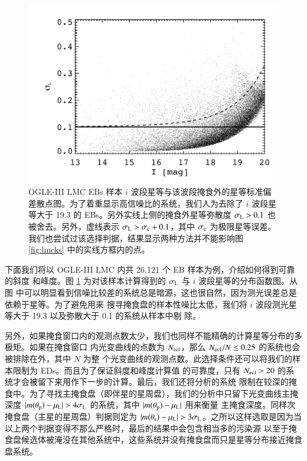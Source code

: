 \begin{figure}[ht!]
\centering
\includegraphics[width=1.0\textwidth,trim={0.4in 0.2in 0 0}]{figures/chapter3/f4_magerr.pdf}
\caption{OGLE-III LMC EBs 样本 $i$ 波段星等与该波段掩食外的星等标准偏差散点图。为了着重显示高信噪比的系统，我们人为去除了 $i$ 波段星等大于 19.3 的 EBs。另外实线上侧的掩食外星等弥散度 $\sigma_\mathrm{L} > 0.1$ 也被舍去。另外，虚线表示 $\sigma_\mathrm{L} > \sigma_\mathrm{c} + 0.1 $，其中 $\sigma_\mathrm{c}$ 为极限星等误差。我们也尝试过该选择判据，结果显示两种方法并不能影响图 \ref{fig:lmcks} 中的实线方框内的点。}
\label{fig:magerr}
\end{figure}

下面我们将以 OGLE-III LMC 内共 26,121 个 EB 样本\cite{Graczyk2011}为例，介绍如何得到可靠的斜度
和峰度。图 \ref{fig:magerr} 为对该样本计算得到的 $\sigma_\mathrm{L}$ 与 $i$ 波段星等的分布函数图。从图
中可以明显看到信噪比较差的系统总是暗源，这也很自然，因为测光误差总是依赖于星等。为了避免用来
搜寻掩食盘的样本性噪比太低，我们将 $i$ 波段测光星等大于 19.3 以及弥散大于 0.1 的系统从样本中剔
除。

另外，如果掩食窗口内的观测点数太少，我们也同样不能精确的计算星等分布的多极矩。如果在掩食窗口
内光变曲线的点数为 $N_\mathrm{ecl}$，那么 $N_\mathrm{ecl}/N \le 0.25$ 的系统也会被排除在外，其中 $N$ 为整
个光变曲线的观测点数。此选择条件还可以将我们的样本限制为 EDs。而且为了保证斜度和峰度计算值
的可靠度，只有 $N_\mathrm{ecl} > 20$ 的系统才会被留下来用作下一步的计算。最后，我们还将分析的系统
限制在较深的掩食中。为了寻找主掩食盘（即伴星的星周盘），我们的分析中只留下光变曲线主掩深度 $|
m(\theta_\mathrm{p}) - \mu_\mathrm{L}| > 4 \sigma_\mathrm{L}$ 的系统，其中 $|m(\theta_\mathrm{p})  - \mu_\mathrm{L}|$ 用来衡量
主掩食深度。同样次掩食盘（主星的星周盘）判据则定为 $|m(\theta_\mathrm{s}) - \mu_\mathrm{L}| > 3 \sigma_
\mathrm{L}$。之所以这样选取是因为当以上两个判据变得不那么严格时，最后的结果中会包含相当多的污染源
以至于掩食盘候选体被淹没在其他系统中，这些系统并没有掩食盘而只是星等分布接近掩食盘系统。

